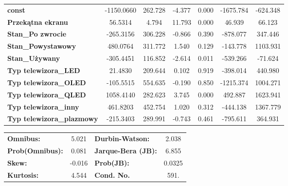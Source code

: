 \documentclass[11pt,a4paper]{article}
\begin{document}
\begin{center}
\begin{tabular}{lcccccc}
				\textbf{const}                    &   -1150.0660  &      262.728     &    -4.377  &         0.000        &    -1675.784    &     -624.348     \\
				\textbf{Przekątna ekranu}         &      56.5314  &        4.794     &    11.793  &         0.000        &       46.939    &       66.123     \\
				\textbf{Stan\_Po zwrocie}         &    -265.3156  &      306.228     &    -0.866  &         0.390        &     -878.077    &      347.446     \\
				\textbf{Stan\_Powystawowy}        &     480.0764  &      311.772     &     1.540  &         0.129        &     -143.778    &     1103.931     \\
				\textbf{Stan\_Używany}            &    -305.4451  &      116.852     &    -2.614  &         0.011        &     -539.266    &      -71.624     \\
				\textbf{Typ telewizora\_LED}      &      21.4830  &      209.644     &     0.102  &         0.919        &     -398.014    &      440.980     \\
				\textbf{Typ telewizora\_OLED}     &    -105.5515  &      554.635     &    -0.190  &         0.850        &    -1215.374    &     1004.271     \\
				\textbf{Typ telewizora\_QLED}     &    1058.4140  &      282.623     &     3.745  &         0.000        &      492.887    &     1623.941     \\
				\textbf{Typ telewizora\_inny}     &     461.8203  &      452.754     &     1.020  &         0.312        &     -444.138    &     1367.779     \\
				\textbf{Typ telewizora\_plazmowy} &    -215.3403  &      289.991     &    -0.743  &         0.461        &     -795.611    &      364.931     \\
				 
			\end{tabular}
			\begin{tabular}{lclc}
				\textbf{Omnibus:}       &  5.021 & \textbf{  Durbin-Watson:     } &    2.038  \\
				\textbf{Prob(Omnibus):} &  0.081 & \textbf{  Jarque-Bera (JB):  } &    6.855  \\
				\textbf{Skew:}          & -0.016 & \textbf{  Prob(JB):          } &   0.0325  \\
				\textbf{Kurtosis:}      &  4.544 & \textbf{  Cond. No.          } &     591.  \\
				 
			\end{tabular}
		\end{center}
		
\end{document}

